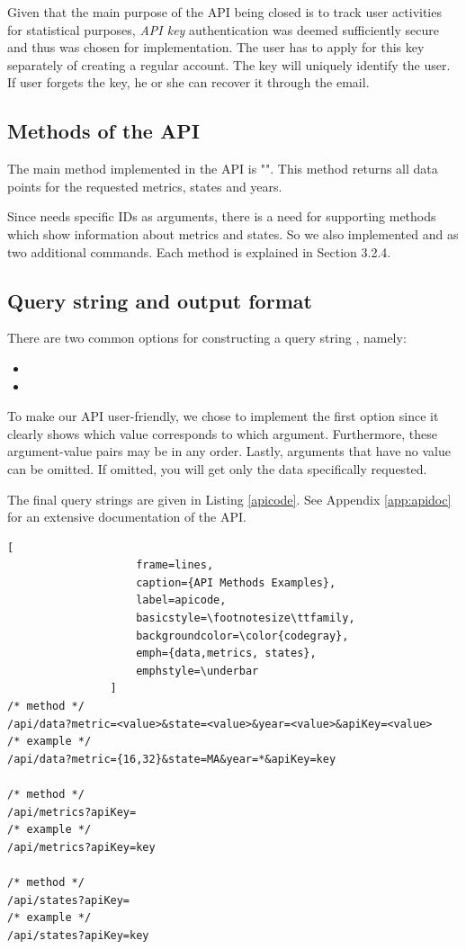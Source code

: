 				Given that the main purpose of the API being closed is to track user activities
				for statistical purposes, \emph{API key} authentication was deemed sufficiently secure and thus was chosen for implementation.
				The user has to apply for this key separately of creating a regular account.
				The key will uniquely identify the user. If user forgets the key, 
				he or she can recover it through the email.

			\subsection{Methods of the API}
				
				The main method implemented in the API is "". 
				This method returns all data points for the requested metrics, states and years.
				
				Since  needs specific IDs as arguments, there is a need for supporting 
				methods which show information about metrics and states. 
				So we also implemented  and  as two additional commands. Each method is explained in Section 3.2.4.

			\subsection{Query string and output format}
			
				There are two common options for constructing a query string \cite{qualtrics}, namely:
				\begin{itemize}
					\item
					\item
				\end{itemize}
				
				To make our API user-friendly, we chose to implement the first option since it clearly 
				shows which value corresponds to which argument. Furthermore, these argument-value pairs may be in any order. 
				Lastly, arguments that have no value can be omitted. If omitted, you will get only the data specifically requested.
				
				The final query strings are given in Listing \ref{apicode}. See
				Appendix \ref{app:apidoc} for an extensive documentation of the
				API.
				
				\begin{lstlisting}[
					frame=lines,
					caption={API Methods Examples}, 
					label=apicode, 
					basicstyle=\footnotesize\ttfamily,
					backgroundcolor=\color{codegray}, 
					emph={data,metrics, states},
					emphstyle=\underbar
				]
/* method */
/api/data?metric=<value>&state=<value>&year=<value>&apiKey=<value>
/* example */
/api/data?metric={16,32}&state=MA&year=*&apiKey=key

/* method */
/api/metrics?apiKey=
/* example */
/api/metrics?apiKey=key

/* method */
/api/states?apiKey=
/* example */
/api/states?apiKey=key
				\end{lstlisting}
				
